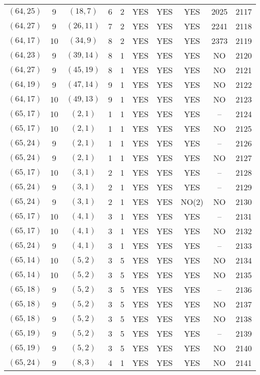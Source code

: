 \begin{longtable}{|c|c|c|c|c|c|c|c|c|c|}
$(64, 25)$ & 9 & $(18, 7)$ & 6 & 2 & YES & YES & YES & 2025 & 2117\\
$(64, 27)$ & 9 & $(26, 11)$ & 7 & 2 & YES & YES & YES & 2241 & 2118\\
$(64, 17)$ & 10 & $(34, 9)$ & 8 & 2 & YES & YES & YES & 2373 & 2119\\
$(64, 23)$ & 9 & $(39, 14)$ & 8 & 1 & YES & YES & YES & NO & 2120\\
$(64, 27)$ & 9 & $(45, 19)$ & 8 & 1 & YES & YES & YES & NO & 2121\\
$(64, 19)$ & 9 & $(47, 14)$ & 9 & 1 & YES & YES & YES & NO & 2122\\
$(64, 17)$ & 10 & $(49, 13)$ & 9 & 1 & YES & YES & YES & NO & 2123\\
$(65, 17)$ & 10 & $(2, 1)$ & 1 & 1 & YES & YES & YES & -- & 2124\\
$(65, 17)$ & 10 & $(2, 1)$ & 1 & 1 & YES & YES & YES & NO & 2125\\
$(65, 24)$ & 9 & $(2, 1)$ & 1 & 1 & YES & YES & YES & -- & 2126\\
$(65, 24)$ & 9 & $(2, 1)$ & 1 & 1 & YES & YES & YES & NO & 2127\\
$(65, 17)$ & 10 & $(3, 1)$ & 2 & 1 & YES & YES & YES & -- & 2128\\
$(65, 24)$ & 9 & $(3, 1)$ & 2 & 1 & YES & YES & YES & -- & 2129\\
$(65, 24)$ & 9 & $(3, 1)$ & 2 & 1 & YES & YES & NO(2) & NO & 2130\\
$(65, 17)$ & 10 & $(4, 1)$ & 3 & 1 & YES & YES & YES & -- & 2131\\
$(65, 17)$ & 10 & $(4, 1)$ & 3 & 1 & YES & YES & YES & NO & 2132\\
$(65, 24)$ & 9 & $(4, 1)$ & 3 & 1 & YES & YES & YES & -- & 2133\\
$(65, 14)$ & 10 & $(5, 2)$ & 3 & 5 & YES & YES & YES & NO & 2134\\
$(65, 14)$ & 10 & $(5, 2)$ & 3 & 5 & YES & YES & YES & NO & 2135\\
$(65, 18)$ & 9 & $(5, 2)$ & 3 & 5 & YES & YES & YES & -- & 2136\\
$(65, 18)$ & 9 & $(5, 2)$ & 3 & 5 & YES & YES & YES & NO & 2137\\
$(65, 18)$ & 9 & $(5, 2)$ & 3 & 5 & YES & YES & YES & NO & 2138\\
$(65, 19)$ & 9 & $(5, 2)$ & 3 & 5 & YES & YES & YES & -- & 2139\\
$(65, 19)$ & 9 & $(5, 2)$ & 3 & 5 & YES & YES & YES & NO & 2140\\
$(65, 24)$ & 9 & $(8, 3)$ & 4 & 1 & YES & YES & YES & NO & 2141\\

\end{longtable}
